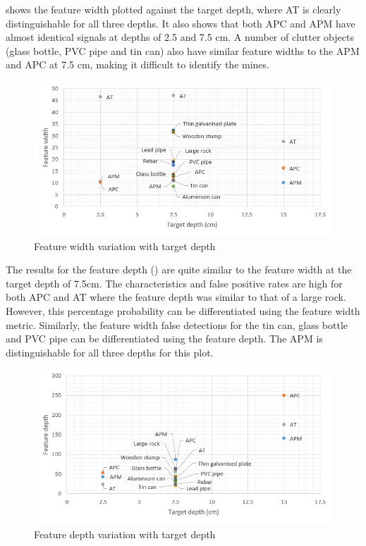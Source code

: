 \documentclass[main.tex]{subfiles}
\begin{document}
 shows the  feature width plotted against the target depth, where AT is clearly distinguishable for all three depths. It also shows that both APC and APM have almost identical signals at depths of 2.5 and 7.5 cm. A number of clutter objects (glass bottle, PVC pipe and tin can) also have similar feature widths to the APM and APC at 7.5 cm, making it difficult to identify the mines. 

\begin{figure}[ht]
\includegraphics[width=\textwidth]{5-Testing/featureWidth.PNG}
\centering
\caption{Feature width variation with target depth}
\end{figure}

The results for the feature depth () are quite similar to the feature width at the target depth of 7.5cm. The characteristics and false positive rates are high for both APC and AT where the feature depth was similar to that of a large rock. However, this percentage probability can be differentiated using the feature width metric. Similarly, the feature width false detections for the tin can, glass bottle and PVC pipe can be differentiated using the feature depth.  The APM is distinguishable for all three depths for this plot.

\begin{figure}[!ht]
\includegraphics[width=\textwidth]{5-Testing/featureDepth.PNG}
\centering
\caption{Feature depth variation with target depth}
\end{figure}
\end{document}
